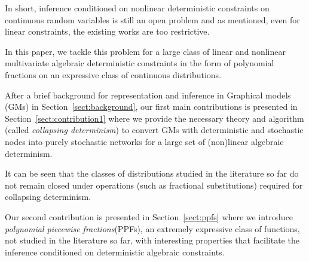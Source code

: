 \documentclass{article}
\begin{document}
In short, inference conditioned on nonlinear deterministic constraints on continuous random variables is still an open problem \cite{li2013dynamic} and as mentioned, even for linear constraints, the existing works are too restrictive.
 
In this paper, we tackle this problem for a large class of linear and nonlinear multivariate algebraic deterministic constraints in the form of polynomial fractions on an expressive class of continuous distributions. 

After a brief background for representation and inference in Graphical models (GMs) in Section~\ref{sect:background}, 
our first main contributions is presented in Section~\ref{sect:contribution1}
where we provide the necessary theory and algorithm (called \emph{collapsing determinism}) 
to convert GMs with deterministic and stochastic nodes into purely stochastic networks for a large set of (non)linear algebraic determinism. 


It can be seen that the classes of distributions studied in the literature so far do not remain closed under operations (such as fractional substitutions) required for collapsing determinism.

Our second contribution is presented in Section~\ref{sect:ppfs} where we 
introduce \emph{polynomial piecewise fractions}(PPFs), an extremely expressive class of functions, not studied in the literature so far, 
with interesting properties that facilitate the inference conditioned on deterministic algebraic constraints.

\end{document}

